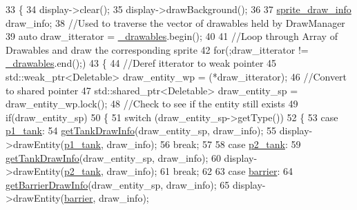 \begin{DoxyCode}
33 \{
34     display->clear();
35     display->drawBackground();
36 
37     \hyperlink{structsprite__draw__info}{sprite\_draw\_info} draw\_info;
38     \textcolor{comment}{//Used to traverse the vector of drawables held by DrawManager}
39     \textcolor{keyword}{auto} draw\_itterator = \hyperlink{classDrawManager_a87982f3a0af2ece0a3a431a8f2fe4478}{\_drawables}.begin();
40 
41     \textcolor{comment}{//Loop through Array of Drawables and draw the corresponding sprite}
42     \textcolor{keywordflow}{for}(;draw\_itterator != \hyperlink{classDrawManager_a87982f3a0af2ece0a3a431a8f2fe4478}{\_drawables}.end();)
43     \{
44         \textcolor{comment}{//Deref itterator to weak pointer}
45         std::weak\_ptr<Deletable> draw\_entity\_wp = (*draw\_itterator);
46         \textcolor{comment}{//Convert to shared pointer}
47         std::shared\_ptr<Deletable> draw\_entity\_sp = draw\_entity\_wp.lock();
48         \textcolor{comment}{//Check to see if the entity still exists}
49         \textcolor{keywordflow}{if}(draw\_entity\_sp)
50         \{
51             \textcolor{keywordflow}{switch} (draw\_entity\_sp->getType())
52             \{
53                 \textcolor{keywordflow}{case} \hyperlink{Structures_8h_a6d8f83e710b27d4f86c45f0bb77066e3a31fa78b2b7dd774f5158a16ef230932e}{p1\_tank}:
54                     \hyperlink{classDrawManager_a450157950bdd23c27bc5dcdafdaa3101}{getTankDrawInfo}(draw\_entity\_sp, draw\_info);
55                     display->drawEntity(\hyperlink{Structures_8h_a6d8f83e710b27d4f86c45f0bb77066e3a31fa78b2b7dd774f5158a16ef230932e}{p1\_tank}, draw\_info);
56                     \textcolor{keywordflow}{break};
57 
58                 \textcolor{keywordflow}{case} \hyperlink{Structures_8h_a6d8f83e710b27d4f86c45f0bb77066e3a3d48d62c7b88e7ee171698fe56dc9e59}{p2\_tank}:
59                     \hyperlink{classDrawManager_a450157950bdd23c27bc5dcdafdaa3101}{getTankDrawInfo}(draw\_entity\_sp, draw\_info);
60                     display->drawEntity(\hyperlink{Structures_8h_a6d8f83e710b27d4f86c45f0bb77066e3a3d48d62c7b88e7ee171698fe56dc9e59}{p2\_tank}, draw\_info);
61                     \textcolor{keywordflow}{break};
62 
63                 \textcolor{keywordflow}{case} \hyperlink{Structures_8h_a6d8f83e710b27d4f86c45f0bb77066e3a6fb040c958f554e1d8320926b700b59d}{barrier}:
64                     \hyperlink{classDrawManager_a41ad9837106a08143f5799c2e50535ff}{getBarrierDrawInfo}(draw\_entity\_sp, draw\_info);
65                     display->drawEntity(\hyperlink{Structures_8h_a6d8f83e710b27d4f86c45f0bb77066e3a6fb040c958f554e1d8320926b700b59d}{barrier}, draw\_info);

\end{DoxyCode}
